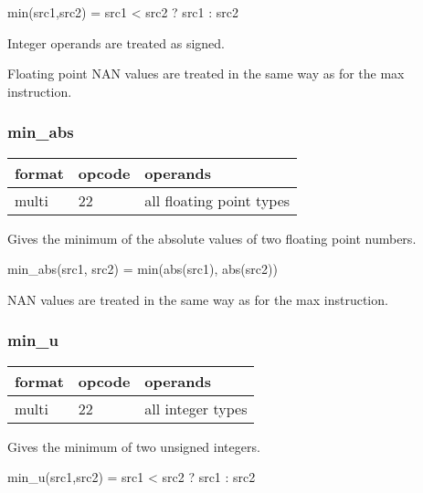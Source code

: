 \documentclass[forwardcom.tex]{subfiles}
\begin{document}
min(src1,src2) = src1 \textless{} src2 ? src1 : src2
\vspace{2mm}

Integer operands are treated as signed.
\vspace{2mm}

Floating point NAN values are treated in the same way as for the max instruction.

\subsubsection{min\_abs}
\label{table:minAbsInstruction}
\begin{tabular}{|p{12mm}|p{12mm}|p{110mm}|}
\hline
\bfseries format & \bfseries opcode & \bfseries operands \\ \hline
multi & 22 & all floating point types \\ \hline
\end{tabular}
\vspace{2mm}

Gives the minimum of the absolute values of two floating point numbers.
\vspace{2mm}

min\_abs(src1, src2) = min(abs(src1), abs(src2))
\vspace{2mm}

NAN values are treated in the same way as for the max instruction.

\subsubsection{min\_u}
\label{table:minUInstruction}
\begin{tabular}{|p{12mm}|p{12mm}|p{110mm}|}
\hline
\bfseries format & \bfseries opcode & \bfseries operands \\ \hline
multi & 22 & all integer types \\ \hline
\end{tabular}
\vspace{2mm}

Gives the minimum of two unsigned integers.
\vspace{2mm}

min\_u(src1,src2) = src1 \textless{} src2 ? src1 : src2
\end{document}
